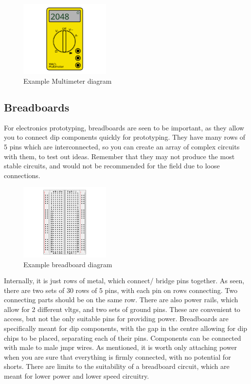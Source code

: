\documentclass[a4paper,11pt]{report}
\begin{document}
\begin{figure}[H]
\centering
\includegraphics[width=0.4\textwidth]{multimeter1}
\caption{Example Multimeter diagram}
\end{figure}

\vspace*{1\baselineskip}

\subsection{Breadboards}

For electronics prototyping, breadboards are seen to be important, as they allow you to connect \gls{dip} components quickly for prototyping. They have many rows of 5 pins which are interconnected, so you can create an array of complex circuits with them, to test out ideas. Remember that they may not produce the most stable circuits, and would not be recommended for the field due to loose connections.

\begin{figure}[H]
\centering
\includegraphics[width=0.4\textwidth]{breadboard}
\caption{Example breadboard diagram}
\end{figure}

Internally, it is just rows of metal, which connect/ bridge pins together. As seen, there are two sets of 30 rows of 5 pins, with each pin on rows connecting. Two connecting parts should be on the same row. There are also power rails, which allow for 2 different \gls{vltg}s, and two sets of ground pins. These are convenient to access, but not the only suitable pins for providing power. Breadboards are specifically meant for \gls{dip} components, with the gap in the centre allowing for \gls{dip} chips to be placed, separating each of their pins. Components can be connected with male to male \gls{jmpr} wires. As mentioned, it is worth only attaching power when you are sure that everything is firmly connected, with no potential for shorts. There are limits to the suitability of a breadboard circuit, which are meant for lower power and lower speed circuitry.
\end{document}
